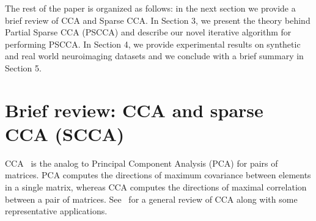 \documentclass{llncs}
\newcommand{\X}{{\bf X}}
\newcommand{\y}{{\bf y}}
\begin{document}
The rest of the paper is organized as follows: in the next section we
provide a brief review of CCA and Sparse CCA. In Section 3, we present
the theory behind Partial Sparse CCA (PSCCA) and describe our novel
iterative algorithm for performing PSCCA. In Section 4, we provide
experimental results on synthetic and real world neuroimaging datasets
and we conclude with a brief summary in Section 5.




\section{Brief review: CCA and sparse CCA (SCCA)}

CCA~\cite{hotellingcca} is the analog to Principal Component Analysis
(PCA) for pairs of matrices. PCA computes the directions of maximum
covariance between elements in a single matrix, whereas CCA computes
the directions of maximal correlation between a pair of matrices.
See~\cite{taylor:cca} for a general review of CCA along with some
representative applications.  %
\end{document}
